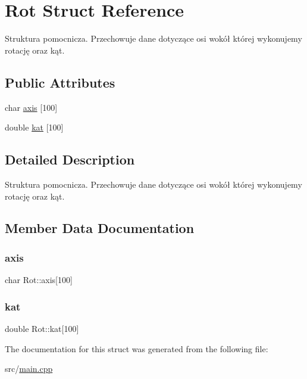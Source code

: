 \hypertarget{struct_rot}{}\section{Rot Struct Reference}
\label{struct_rot}


Struktura pomocnicza. Przechowuje dane dotyczące osi wokół której wykonujemy rotację oraz kąt.  


\subsection*{Public Attributes}
\begin{DoxyCompactItemize}
\item 
char \hyperlink{struct_rot_a7c26972d7270e364a160608c16cb676d}{axis} \mbox{[}100\mbox{]}
\item 
double \hyperlink{struct_rot_adb800f39693584362670de88dea1f8df}{kat} \mbox{[}100\mbox{]}
\end{DoxyCompactItemize}


\subsection{Detailed Description}
Struktura pomocnicza. Przechowuje dane dotyczące osi wokół której wykonujemy rotację oraz kąt. 

\subsection{Member Data Documentation}
\mbox{\label{struct_rot_a7c26972d7270e364a160608c16cb676d}} 
\subsubsection{\texorpdfstring{axis}{axis}}
{\footnotesize\ttfamily char Rot\+::axis\mbox{[}100\mbox{]}}

\mbox{\label{struct_rot_adb800f39693584362670de88dea1f8df}} 
\subsubsection{\texorpdfstring{kat}{kat}}
{\footnotesize\ttfamily double Rot\+::kat\mbox{[}100\mbox{]}}



The documentation for this struct was generated from the following file\+:\begin{DoxyCompactItemize}
\item 
src/\hyperlink{main_8cpp}{main.\+cpp}\end{DoxyCompactItemize}
